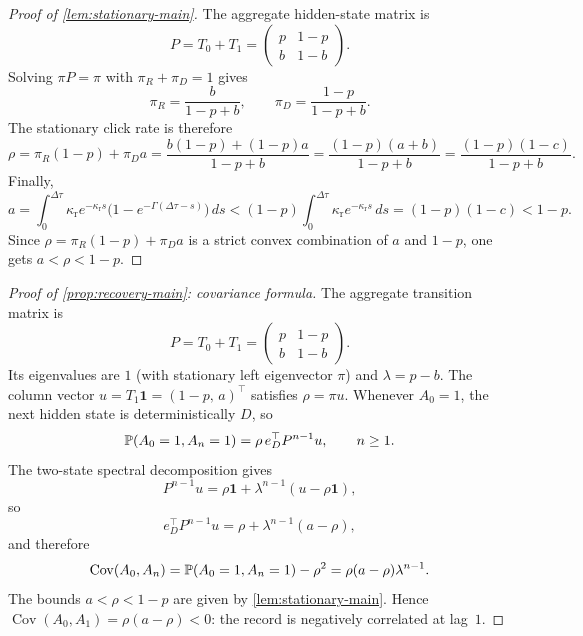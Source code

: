 \begin{proof}[Proof of \cref{lem:stationary-main}]
The aggregate hidden-state matrix is
\[
P=T_0+T_1=
\begin{pmatrix}
 p & 1-p\\
 b & 1-b
\end{pmatrix}.
\]
Solving $\pi P=\pi$ with $\pi_R+\pi_D=1$ gives
\[
\pi_R=\frac{b}{1-p+b},
\qquad
\pi_D=\frac{1-p}{1-p+b}.
\]
The stationary click rate is therefore
\[
\rho=\pi_R(1-p)+\pi_D a
=
\frac{b(1-p)+(1-p)a}{1-p+b}
=
\frac{(1-p)(a+b)}{1-p+b}
=
\frac{(1-p)(1-c)}{1-p+b}.
\]
Finally,
\[
a=\int_0^{\Delta\tau}\kappa_{\mathrm r}e^{-\kappa_{\mathrm r}s}\bigl(1-e^{-\Gamma(\Delta\tau-s)}\bigr)\,ds
<
(1-p)\int_0^{\Delta\tau}\kappa_{\mathrm r}e^{-\kappa_{\mathrm r}s}\,ds
=(1-p)(1-c)
<
1-p.
\]
Since $\rho=\pi_R(1-p)+\pi_D a$ is a strict convex combination of $a$ and $1-p$, one gets $a<\rho<1-p$.
\end{proof}

\begin{proof}[Proof of \cref{prop:recovery-main}: covariance formula]
The aggregate transition matrix is
\[
P = T_0+T_1 =
\begin{pmatrix}
 p & 1-p\\
 b & 1-b
\end{pmatrix}.
\]
Its eigenvalues are $1$ (with stationary left eigenvector $\pi$) and $\lambda=p-b$. The column vector $u=T_1\mathbf{1}=(1-p,\,a)^\top$ satisfies $\rho=\pi u$. Whenever $A_0=1$, the next hidden state is deterministically $D$, so
\[
\mathbb{P}(A_0=1,A_n=1)=\rho\,e_D^\top P^{n-1}u,\qquad n\ge1.
\]
The two-state spectral decomposition gives
\[
P^{n-1}u = \rho\mathbf{1}+\lambda^{n-1}(u-\rho\mathbf{1}),
\]
so
\[
e_D^\top P^{n-1}u = \rho+\lambda^{n-1}(a-\rho),
\]
and therefore
\[
\operatorname{Cov}(A_0,A_n) = \mathbb{P}(A_0=1,A_n=1)-\rho^2 = \rho(a-\rho)\lambda^{n-1}.
\]
The bounds $a<\rho<1-p$ are given by \cref{lem:stationary-main}. Hence $\operatorname{Cov}(A_0,A_1)=\rho(a-\rho)<0$: the record is negatively correlated at lag~$1$.
\end{proof}

